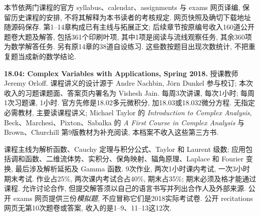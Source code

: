 \par
本节依两门课程的官方 syllabus、calendar、assignments 与 exams 网页译编, 保留历史课程的安排, 不将其解释为本书读者的考核规定. 网页快照及确切下载地址随源码保存. 第1--14章构成已有主线与拓展正文; 后续章节按原编号收入160道公开题卷大题及解答, 包括361个印刷叶项, 其中1项是阅读与流线观察任务, 其余360项为数学解答任务. 另有原14章的38道自设练习. 这些数按题目出现次数统计, 不把重复题当成新的数学结论.

\noindent\textbf{18.04: Complex Variables with Applications, Spring 2018.}
授课教师 Jeremy Orloff. 课程讲义的设计源于 Andre Nachbin, Jörn Dunkel 参与校订; 本次收入的习题课题面、答案页内署名为 Vishesh Jain. 每周3次讲课, 每次1小时; 每周1次习题课, 1小时. 官方先修是18.02多元微积分, 加18.03或18.032微分方程. 无指定必需教材, 主要读课程讲义; Michael Taylor 的 \textit{Introduction to Complex Analysis}, Beck、Marchesi、Pixton、Sabalka 的 \textit{A First Course in Complex Analysis} 与 Brown、Churchill 第9版教材为补充阅读, 本档案不收入这些第三方书.

课程主线为解析函数、Cauchy 定理与积分公式、Taylor 和 Laurent 级数; 应用包括调和函数、二维流体势、实积分、保角映射、辐角原理、Laplace 和 Fourier 变换, 最后涉及解析延拓及 Gamma 函数. 9次作业, 两次1小时课内考试, 一次3小时期末考试. 作业占25\%, 两次课内考试合占40\%, 期末占35\%; 期末必须及格才能通过课程. 允许讨论合作, 但提交解答须以自己的语言书写并列出合作人及外部来源. 公开 exams 网页提供三份\emph{模拟题}, 不应冒称它们是2018实际考试卷. 公开 recitations 网页无第10次题卷或答案, 收入的是1--9、11--13这12次.

